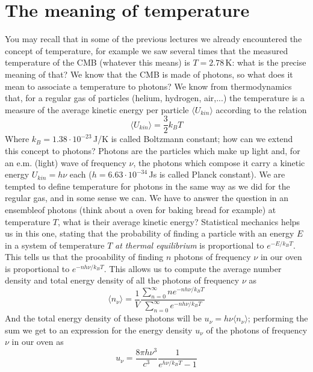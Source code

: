\section{The meaning of temperature}
You may recall that in some of the previous lectures we already encountered the concept of temperature, for example we saw several times that the measured temperature of the CMB (whatever this means) is $T=2.78$\,K: what is the precise meaning of that? We know that the CMB is made of photons, so what does it mean to associate a temperature to photons? We know from thermodynamics that, for a regular gas of particles (helium, hydrogen, air,...) the temperature is a measure of the average kinetic energy per particle $\langle U_{kin}\rangle$ according to the relation
\begin{equation}
\langle U_{kin}\rangle =\frac{3}{2}k_BT
\end{equation}
Where $k_B=1.38\cdot 10^{-23}$\,J/K is called Boltzmann constant; how can we extend this concept to photons? Photons are the particles which make up light and, for an e.m. (light) wave of frequency $\nu$, the photons which compose it carry a kinetic energy $U_{kin}=h\nu$ each ($h=6.63\cdot 10^{-34}$\,Js is called Planck constant). We are tempted to define temperature for photons in the same way as we did for the regular gas, and in some sense we can. We have to answer the question in an ensembleof photons (think about a oven for baking bread for example) at temperature $T$, what is their average kinetic energy? Statistical mechanics helps us in this one, stating that the probability of finding a particle with an energy $E$ in a system of temperature $T$ \textit{at thermal equilibrium} is proportional to $e^{-E/k_BT}$. This tells us that the prooability of finding $n$ photons of frequency $\nu$ in our oven is proportional to $e^{-nh\nu/k_BT}$. This allows us to compute the average number density and total 
energy density of all the photons of frequency $\nu$ as 
\begin{equation}
\langle n_\nu\rangle=\frac{1}{V}\frac{\sum_{n=0}^{\infty}ne^{-nh\nu/k_BT}}{\sum_{n=0}^{\infty}e^{-nh\nu/k_BT}}
\end{equation}
And the total energy density of these photons will be $u_\nu=h\nu \langle n_\nu\rangle$; performing the sum we get to an expression for the energy density $u_\nu$ of the photons of frequency $\nu$ in our oven as 
\begin{equation}
\label{planck}
u_\nu=\frac{8\pi h\nu^3}{c^3}\frac{1}{e^{h\nu/k_BT}-1}
\end{equation}
